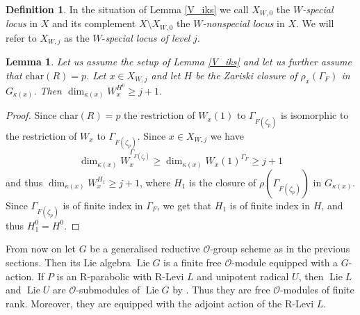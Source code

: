 \documentclass{amsart}
\newtheorem{lem}[prop]{Lemma}
\theoremstyle{definition}
\newtheorem{defi}[prop]{Definition}
\theoremstyle{remark}
\newcommand{\OO}{\mathcal O}
\DeclareMathOperator{\Lie}{Lie}
\newcommand{\chara}{\mathrm{char}}
\begin{document}
\begin{defi}\label{defi_W_special} In the situation of Lemma \ref{V_iks} we call $X_{W,0}$ the \emph{$W$-special 
locus} in $X$ and its complement $X\setminus X_{W,0}$ the \emph{$W$-nonspecial locus} in $X$. 
We will refer to $X_{W,j}$ as the $W$-\emph{special locus of level} $j$.
\end{defi}


\begin{lem}\label{inv_non} Let us assume the setup of Lemma \ref{V_iks} and let 
us further assume that $\chara (R) =p$. Let $x\in X_{W,j}$ and let $H$ 
be the Zariski closure of $\rho_x(\Gamma_F)$ in $G_{\kappa(x)}$. Then 
$\dim_{\kappa(x)} W_x^{H^0}\ge j+1$. 
\end{lem}
\begin{proof} Since $\chara (R) =p$ the restriction of 
$W_x(1)$ to $\Gamma_{F(\zeta_p)}$ is isomorphic to the restriction of $W_x$ to $\Gamma_{F(\zeta_p)}$. 
Since $x\in X_{W,j}$ we have 
$$\dim_{\kappa(x)} W_x^{\Gamma_{F(\zeta_p)}}\ge \dim_{\kappa(x)} W_x(1)^{\Gamma_F}\ge j+1$$ and thus 
$\dim_{\kappa(x)} W_x^{H_1}\ge j+1$, where $H_1$ is the closure 
of $\rho(\Gamma_{F(\zeta_p)})$ in $G_{\kappa(x)}$. 
Since   $\Gamma_{F(\zeta_p)}$ is of finite index in $\Gamma_F$, 
we get that $H_1$ is of finite index in $H$, and thus $H_1^0=H^0$.
\end{proof}

From now on let $G$ be a generalised reductive  $\OO$-group scheme as in the previous 
sections. Then its Lie algebra $\Lie G$ is a finite free $\OO$-module equipped with a $G$-action. 
If $P$ is an R-parabolic with R-Levi $L$ 
and unipotent radical $U$, then $\Lie L$ and $\Lie U$ are $\OO$-submodules of $\Lie G$ by 
\cite[Theorem 4.1.7, part 4]{conrad}. Thus they are free $\OO$-modules of finite rank. Moreover, they are equipped 
with the adjoint action of the R-Levi $L$. 
\end{document}
